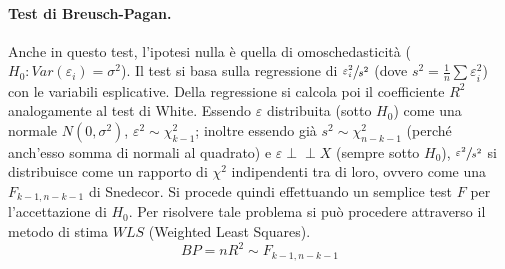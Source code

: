 \documentclass[a4page, 11pt]{article} %
\def\indep{\perp \!\!\! \perp }
\begin{document}
\paragraph{Test di Breusch-Pagan.} Anche in questo test, l’ipotesi nulla è quella di omoschedasticità ($H_0: Var(\varepsilon_i) = \sigma^2$).
Il test si basa sulla regressione di $\sfrac{\varepsilon^2_i}{s^2}$ (dove $s^2 = \frac{1}{n}\sum{\varepsilon_i^2}$) con le variabili esplicative.
Della regressione si calcola poi il coefficiente $R^2$ analogamente al test di White.
Essendo  $\varepsilon$ distribuita (sotto $H_0$) come una normale $N(0, \sigma^2)$, $\varepsilon^2 \sim \chi^2_{k-1}$; inoltre essendo già $s^2 \sim \chi^2_{n-k-1}$ (perché anch'esso somma di normali al quadrato) e $\varepsilon \indep X$ (sempre sotto $H_0$), $\sfrac{\varepsilon^2}{s^2}$ si distribuisce come un rapporto di $\chi^2$ indipendenti tra di loro, ovvero come una $F_{k-1, n-k-1}$ di Snedecor.
Si procede quindi effettuando un semplice test $F$ per l'accettazione di $H_0$.
Per risolvere tale problema si può procedere attraverso il metodo di stima $WLS$ (Weighted Least Squares).
\begin{equation*}
  BP = nR^2 \sim F_{k-1, n-k-1}
\end{equation*}
\end{document}
